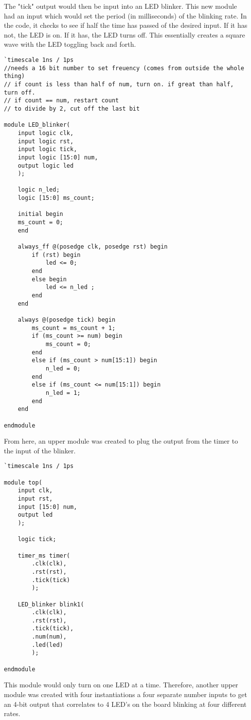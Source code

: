 \documentclass[11pt]{article}
\begin{document}
\quad The "tick" output would then be input into an LED blinker. This new module had an input which would set the period (in milliseconds) of the blinking rate. In the code, it checks to see if half the time has passed of the desired input. If it has not, the LED is on. If it has, the LED turns off. This essentially creates a square wave with the LED toggling back and forth. 

\begin{lstlisting}[style=Verilog,caption=LED Blinker Module Code,label=code:ex ]
`timescale 1ns / 1ps
//needs a 16 bit number to set freuency (comes from outside the whole thing) 
// if count is less than half of num, turn on. if great than half, turn off. 
// if count == num, restart count 
// to divide by 2, cut off the last bit 

module LED_blinker(
	input logic clk, 
	input logic rst, 
	input logic tick,
	input logic [15:0] num, 
	output logic led
	);
	
	logic n_led;
	logic [15:0] ms_count; 
	
	initial begin 
	ms_count = 0; 
	end
	
	always_ff @(posedge clk, posedge rst) begin 
		if (rst) begin 
			led <= 0; 
		end
		else begin 
			led <= n_led ; 
		end
	end
	
	always @(posedge tick) begin 
		ms_count = ms_count + 1; 
		if (ms_count >= num) begin 
			ms_count = 0; 
		end
		else if (ms_count > num[15:1]) begin 
			n_led = 0; 
		end
		else if (ms_count <= num[15:1]) begin 
			n_led = 1;  
		end
	end 

endmodule
\end{lstlisting}

\quad From here, an upper module was created to plug the output from the timer to the input of the blinker. 

\begin{lstlisting}[style=Verilog,caption=Single LED blinker module,label=code:ex ]
`timescale 1ns / 1ps

module top(
	input clk,
	input rst,
	input [15:0] num, 
	output led
	);
	
	logic tick; 
	
	timer_ms timer( 
		.clk(clk), 
		.rst(rst), 
		.tick(tick)
		);
		
	LED_blinker blink1( 
		.clk(clk), 
		.rst(rst),
		.tick(tick), 
		.num(num), 
		.led(led)
		);

endmodule
\end{lstlisting}

\quad This module would only turn on one LED at a time. Therefore, another upper module was created with four instantiations a four separate number inputs to get an 4-bit output that correlates to 4 LED's on the board blinking at four different rates. 
\end{document}
